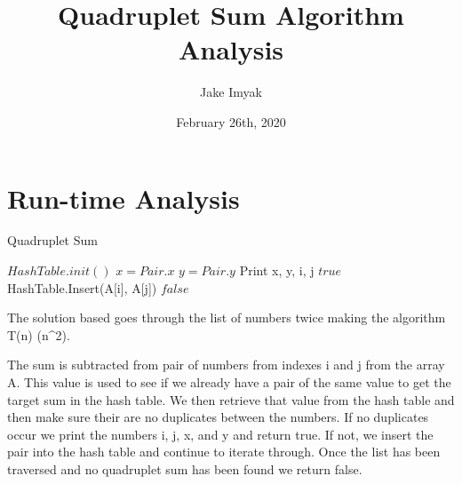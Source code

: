 \documentclass{article}
\title{Quadruplet Sum Algorithm Analysis}
\author{Jake Imyak }
\date{February 26th, 2020}
\begin{document}
\maketitle

\section*{Run-time Analysis}

\begin{algorithm}
\caption{Quadruplet Sum}\label{euclid}
\begin{algorithmic}[1]
\State $HashTable.init()$
                \State $x = Pair.x$
                \State $y = Pair.y$
                    \State Print x, y, i, j 
                    \State
                    \Return $true$
                \EndIf
            \EndFor
        \EndIf
        \State HashTable.Insert(A[i], A[j])
    \EndFor
\EndFor
\State
\Return $false$
\EndProcedure


\end{algorithmic}
\end{algorithm}

The solution based goes through the list of numbers twice making the \newline algorithm T(n) \in \Theta (n^2). 

The sum is subtracted from pair of numbers from indexes i and j from the array A. This value is used to see if we already have a pair of the same value to get the target sum in the hash table. We then retrieve that value from the hash table and then make sure their are no duplicates between the numbers. If no duplicates occur we print the numbers i, j, x, and y and return true. If not, we insert the pair into the hash table and continue to iterate through. Once the list has been traversed and no quadruplet sum has been found we return false.
\end{document}
